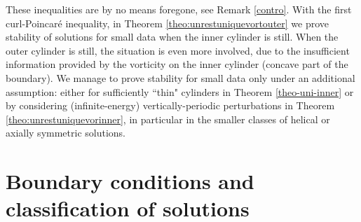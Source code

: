 \documentclass[a4paper,11pt]{amsart}
\numberwithin{equation}{section}
\numberwithin{figure}{section}
\begin{document}
These inequalities are by no means foregone, see Remark
\ref{contro}. With the first curl-Poincaré inequality,
in Theorem \ref{theo:unrestuniquevortouter} we
prove stability of solutions for small data
when the inner cylinder is still. When the outer cylinder is still, the situation is even more involved,
due to the insufficient information provided by the
vorticity on the inner cylinder (concave part of the 
boundary). We manage to prove stability for small data only
under an additional assumption: either for sufficiently ``thin"
cylinders in Theorem \ref{theo-uni-inner} or by considering (infinite-energy) vertically-periodic perturbations in Theorem
\ref{theo:unrestuniquevorinner}, in particular in the 
smaller classes of helical or axially symmetric solutions.

	\section{Boundary conditions and classification of solutions}\label{sec-functional}
	
\end{document}
